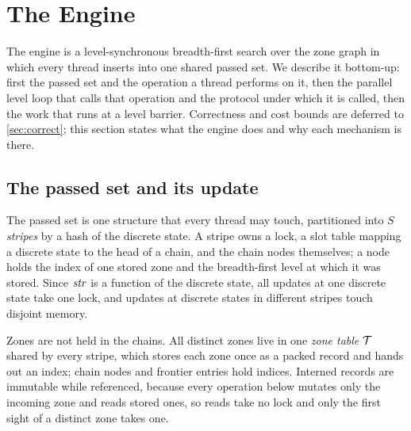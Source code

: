 \section{The Engine}\label{sec:approach}

The engine is a level-synchronous breadth-first search over the zone graph in
which every thread inserts into one shared passed set.  We describe it bottom-up:
first the passed set and the operation a thread performs on it, then the parallel
level loop that calls that operation and the protocol under which it is called,
then the work that runs at a level barrier.  Correctness and cost bounds are
deferred to \cref{sec:correct}; this section states what the engine does and why
each mechanism is there.

\subsection{The passed set and its update}\label{sec:passed}

The passed set is one structure that every thread may touch, partitioned into $S$
\emph{stripes} by a hash of the discrete state.  A stripe owns a lock, a slot
table mapping a discrete state to the head of a chain, and the chain nodes
themselves; a node holds the index of one stored zone and the breadth-first level
at which it was stored.  Since $\mathit{str}$ is a function of the discrete state, all
updates at one discrete state take one lock, and updates at discrete states in
different stripes touch disjoint memory.

Zones are not held in the chains.  All distinct zones live in one \emph{zone
table} $\mathcal{T}$ shared by every stripe, which stores each zone once as a packed
record and hands out an index; chain nodes and frontier entries hold indices.
Interned records are immutable while referenced, because every operation below
mutates only the incoming zone and reads stored ones, so reads take no lock and
only the first sight of a distinct zone takes one.

